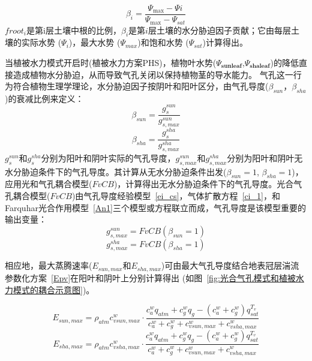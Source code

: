 \begin{equation}\label{beta_i}
\beta_{i}=\frac{\Psi_{\max }-\Psi i}{\Psi_{\max }-\Psi_{s a t}}
\end{equation}
$froot_i$是第i层土壤中根的比例，$\beta_i$是第$i$层土壤的水分胁迫因子贡献；它由每层土壤的实际水势 (${\Psi}_i$)，最大水势 (${\Psi}_{max}$)和饱和水势 (${\Psi}_{sat}$)计算得出。

当植被水力模式开启时(植被水力方案PHS)，植物叶水势($\Psi_{\mathbf{sunleaf}}$,$\Psi_{\mathbf{shaleaf}}$)的降低直接造成植物水分胁迫，从而导致气孔关闭以保持植物茎的导水能力。
气孔这一行为符合植物生理学理论，水分胁迫因子按阴叶和阳叶区分，由气孔导度($\beta_{sun}$，$\beta_{sha}$)的衰减比例来定义：
\begin{equation}\label{beta_sun}
\beta_{sun}=\frac{g_{s}^{sun}}{g_{s,max}^{sun}}
\end{equation}
\begin{equation}\label{beta_sha}
\beta_{sha}=\frac{g_{s}^{sha}}{g_{s,max}^{sha}}
\end{equation}
$g_{s}^{sun}$和$g_{s}^{sha}$分别为阳叶和阴叶实际的气孔导度，$g_{s,max}^{sun}$和$g_{s,max}^{sha}$分别为阳叶和阴叶无水分胁迫条件下的气孔导度。其计算从无水分胁迫条件出发($\beta_{sun}=1$, $\beta_{sha}=1$)，应用光和气孔耦合模型($FvCB$)，计算得出无水分胁迫条件下的气孔导度。光合气孔耦合模型($FvCB$)由气孔导度经验模型~\eqref{ei_cs}，气体扩散方程~\eqref{ci_1}，和Farquhar光合作用模型~\eqref{An1}三个模型或方程联立而成，气孔导度是该模型重要的输出变量：
\begin{equation}\label{gs_sunmax}
g_{s,max}^{sun}=FvCB\left(\beta_{sun}=1\right)
\end{equation}
\begin{equation}\label{gs_shamax}
g_{s,max}^{sha}=FvCB\left(\beta_{sha}=1\right)
\end{equation}


相应地，最大蒸腾速率($E_{sun,max}$和$E_{sha,max}$)可由最大气孔导度结合地表冠层湍流参数化方案~\eqref{Epv}在阳叶和阴叶上分别计算得出 (如图~\ref{fig:光合气孔模式和植被水力模式的耦合示意图})。

\begin{equation}\label{E_sunmax}
E_{sun,max}=\rho_{atm} c_{vsun,max}^{w} \cdot \frac{c_{a}^{w} q_{atm}+c_{g}^{w} q_{g}-
\left(c_{a}^{w}+c_{g}^{w}\right) q_{s a t}^{T_{v}}}{c_{a}^{w}+c_{g}^{w}+c_{vsun,max}^{w}+c_{vsha,max}^{w}}
\end{equation}
%
\begin{equation}\label{Eshamax}
E_{sha,max}=\rho_{atm} c_{vsha,max}^{w} \cdot \frac{c_{a}^{w} q_{atm}+c_{g}^{w} q_{g}-
\left(c_{a}^{w}+c_{g}^{w}\right) q_{s a t}^{T_{v}}}{c_{a}^{w}+c_{g}^{w}+c_{vsun,max}^{w}+c_{vsha,max}^{w}}
\end{equation}


